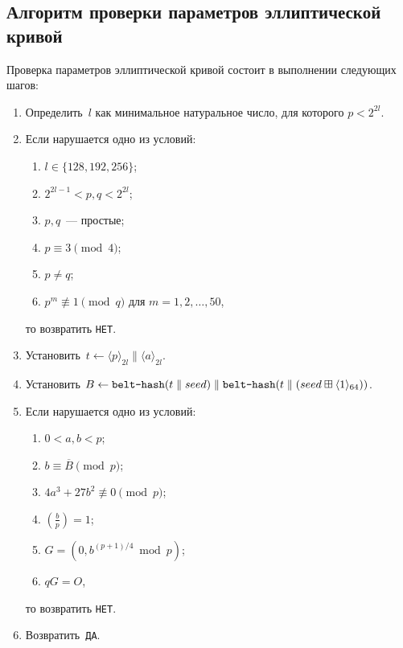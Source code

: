 \subsection{Алгоритм проверки параметров эллиптической кривой}\label{VALEC}

Проверка параметров эллиптической кривой состоит 
в выполнении следующих шагов:
\begin{enumerate}
\item
Определить~$l$ как минимальное натуральное число, 
для которого $p<2^{2l}$.
\item
Если нарушается одно из условий:
\begin{enumerate}
\item
$l\in\{128,192,256\}$;
\item
$2^{2l-1}<p,q<2^{2l}$;
\item
$p,q$~--- простые;
\item
$p\equiv 3\pmod{4}$;
\item
$p\neq q$;
\item
$p^m\not\equiv 1\pmod{q}$ для $m=1,2,\ldots,50$,
\end{enumerate}
то возвратить \texttt{НЕТ}.

\item
Установить~$t\leftarrow \langle p\rangle_{2l}\parallel \langle a\rangle_{2l}$.

\item
Установить
$B\leftarrow 
\texttt{belt-hash}(t\parallel seed)
\parallel
\texttt{belt-hash}(t\parallel(
seed\boxplus\langle 1\rangle_{64}))$.

\item
Если нарушается одно из условий:
\begin{enumerate}
\item
$0<a,b<p$;
\item
$b\equiv \overline{B}\pmod p$;
\item
$4a^3+27b^2\not\equiv 0\pmod{p}$;
\item
$\left(\frac{b}{p}\right)=1$;
\item
$G=(0,b^{(p+1)/4}\bmod p)$;
\item
$qG=O$,
\end{enumerate}
то возвратить \texttt{НЕТ}.
\item
Возвратить~\texttt{ДА}.
\end{enumerate}


